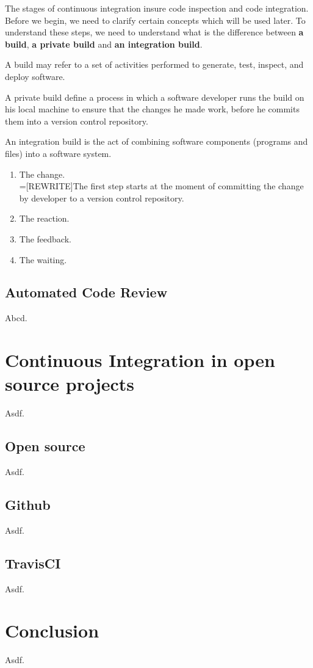 The stages of continuous integration insure code inspection and code integration. Before we begin, we need to clarify certain concepts which will be used later. To understand these steps, we need to understand what is the difference between \textbf{a build}, \textbf{a private build} and \textbf{an integration build}.

\begin{DEF}
A build may refer to a set of activities performed to generate, test, inspect, and deploy software.\cite{CI}
\end{DEF}

\begin{DEF}
A private build define a process in which a software developer runs the build on his local machine to ensure that the changes he made work, before he commits them into a version control repository.
\end{DEF}

\begin{DEF}
An integration build is the act of combining software components (programs and files) into a software system.\cite{CI}
\end{DEF}

\begin{enumerate}
	\item The change.\\
		  =[REWRITE]The first step starts at the moment of committing the change by developer to a version control repository.
	\item The reaction.
	\item The feedback.
	\item The waiting.
\end{enumerate}



\section{Automated Code Review}
Abcd.

\chapter{Continuous Integration in open source projects}
Asdf.

\section{Open source}
Asdf.

\section{Github}
Asdf.

\section{TravisCI}
Asdf.

\chapter{Conclusion}
Asdf.

